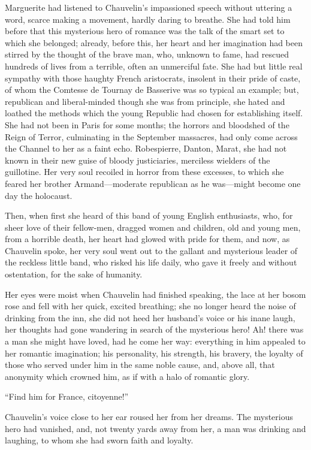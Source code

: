 Marguerite had listened to Chauvelin's impassioned  speech without uttering a word, scarce making a movement, hard\-ly daring to breathe. She had told him before that this mysterious hero of romance was the talk of the smart set to which she belonged; already, before this, her heart and her imagination had been stirred by the thought of the brave man, who, unknown to fame, had rescued hundreds of lives from a terrible, often an unmerciful fate. She had but little real sympathy with those haughty French aristocrats, insolent in their pride of caste, of whom the Comtesse de Tournay de Basserive was so typical an example; but, republican and liberal-minded though she was from principle, she hated and loathed the methods which the young Republic had chosen for establishing itself. She had not been in Paris for some months; the horrors and bloodshed of the Reign of Terror, culminating in the September massacres, had only come across the Channel to her as a faint echo. Robespierre, Danton, Marat, she had not known in their new guise of bloody justiciaries, merciless wielders of the guillotine. Her very soul recoiled in horror from these excesses, to which she feared her brother Armand---moderate republican as he was---might become one day the holocaust.

Then, when first she heard of this band of young English enthusiasts, who, for sheer love of their fellow-men, dragged women and children, old and young men, from a horrible death, her heart had glowed with pride for them, and now, as Chauvelin spoke, her very soul went out to the gallant and mysterious leader of the reckless little band, who risked his life daily, who gave it freely and without ostentation, for the sake of humanity.

Her eyes were moist when Chauvelin had finished speaking, the lace at her bosom rose and fell with her quick, excited breathing; she no longer heard the noise of drinking from the inn, she did not heed her husband's voice or his inane laugh, her thoughts had gone wandering in search of the mysterious hero! Ah! there was a man she might have loved, had he come her way: everything in him appealed to her romantic imagination; his personality, his strength, his bravery, the loyalty of those who served under him in the same noble cause, and, above all, that anonymity which crowned him, as if with a halo of romantic glory.

\enquote{Find him for France, citoyenne!}

Chauvelin's voice close to her ear roused her from her dreams. The mysterious hero had vanished, and, not twenty yards away from her, a man was drinking and laughing, to whom she had sworn faith and loyalty.

